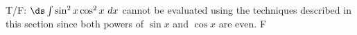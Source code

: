 {T/F: $\ds \int \sin^2x\cos^2x \ dx$ cannot be evaluated using the techniques described in this section since both powers of $\sin x$ and $\cos x$ are even.}
{F}
